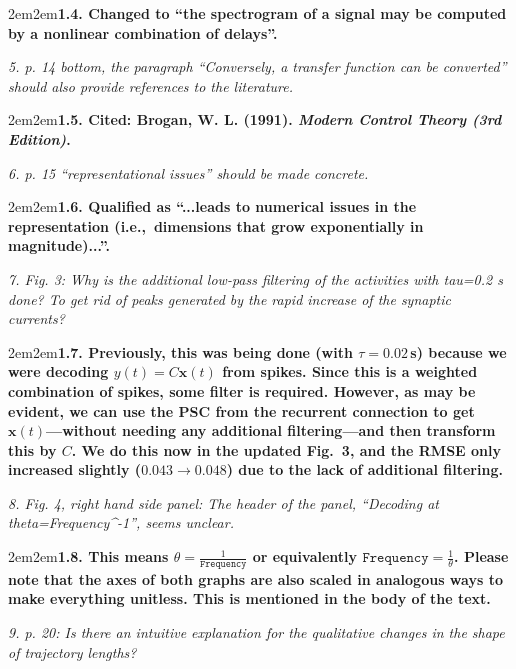 \documentclass[a4paper]{article}
\newcommand{\newl}{\par\null\par}
\newcommand{\REVIEW}[1]{{\it #1}}
\newcommand{\REPLY}[1]{\newl\begin{adjustwidth}{2em}{2em}{\bf #1}\end{adjustwidth}\newl}
\begin{document}
\REPLY{1.4. Changed to ``the spectrogram of a signal may be computed by a nonlinear combination of delays''.}

\REVIEW{5. p. 14 bottom, the paragraph ``Conversely, a transfer function can be converted'' should also provide references to the literature.}

\REPLY{1.5. Cited: Brogan, W. L. (1991). \textit{Modern Control Theory (3rd Edition)}.}

\REVIEW{6. p. 15 ``representational issues'' should be made concrete.}

\REPLY{1.6. Qualified as ``...leads to numerical issues in the representation (i.e.,~dimensions that grow exponentially in magnitude)...''.}

\REVIEW{7. Fig. 3: Why is the additional low-pass filtering of the activities with tau=0.2 s done? To get rid of peaks generated by the rapid increase of the synaptic currents?}

\REPLY{1.7. Previously, this was being done (with $\tau=0.02$\,s) because we were decoding $y(t) = C{\mathbf x}(t)$ from spikes.
Since this is a weighted combination of spikes, some filter is required.
However, as may be evident, we can use the PSC from the recurrent connection to get ${\mathbf x}(t)$---without needing any additional filtering---and then transform this by $C$.
We do this now in the updated Fig.~3, and the RMSE only increased slightly ($0.043 \rightarrow 0.048$) due to the lack of additional filtering.}

\REVIEW{8. Fig. 4, right hand side panel: The header of the panel, ``Decoding at theta=Frequency\^{}-1'', seems unclear.}

\REPLY{1.8. This means $\theta = \frac{1}{\texttt{Frequency}}$ or equivalently ${\texttt{Frequency}} = \frac{1}{\theta}$.
Please note that the axes of both graphs are also scaled in analogous ways to make everything unitless.
This is mentioned in the body of the text.}

\REVIEW{9. p. 20: Is there an intuitive explanation for the qualitative changes in the shape of trajectory lengths?}
\end{document}
